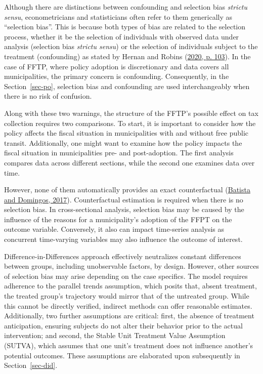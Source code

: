\documentclass[12pt, a4paper, twoside]{article}
\numberwithin{equation}{subsection} %
\begin{document}
Although there are distinctions between confounding and selection bias
\textit{strictu sensu}, econometricians and statisticians often refer to
them generically as ``selection bias''. This is because both types of
bias are related to the selection process, whether it be the selection
of individuals with observed data under analysis (selection bias
\textit{strictu sensu}) or the selection of individuals subject to the
treatment (confounding) as stated by Hernan and Robins
(\protect\hyperlink{ref-Hernan2020}{2020, p. 103}). In the case of FFTP,
where policy adoption is discretionary and data covers all
municipalities, the primary concern is confounding. Consequently, in the
Section~\ref{sec-po}, selection bias and confounding are used
interchangeably when there is no risk of confusion.

Along with these two warnings, the structure of the FFTP's possible
effect on tax collection requires two comparisons. To start, it is
important to consider how the policy affects the fiscal situation in
municipalities with and without free public transit. Additionally, one
might want to examine how the policy impacts the fiscal situation in
municipalities pre- and post-adoption. The first analysis compares data
across different sections, while the second one examines data over time.

However, none of them automatically provides an exact counterfactual
(\protect\hyperlink{ref-batista_domingos_2017}{Batista and Domingos,
2017}). Counterfactual estimation is required when there is no selection
bias. In cross-sectional analysis, selection bias may be caused by the
influence of the reasons for a municipality's adoption of the FFPT on
the outcome variable. Conversely, it also can impact time-series
analysis as concurrent time-varying variables may also influence the
outcome of interest.

Difference-in-Differences approach effectively neutralizes constant
differences between groups, including unobservable factors, by design.
However, other sources of selection bias may arise depending on the case
specifics. The model requires adherence to the parallel trends
assumption, which posits that, absent treatment, the treated group's
trajectory would mirror that of the untreated group. While this cannot
be directly verified, indirect methods can offer reasonable estimates.
Additionally, two further assumptions are critical: first, the absence
of treatment anticipation, ensuring subjects do not alter their behavior
prior to the actual intervention; and second, the Stable Unit Treatment
Value Assumption (SUTVA), which assumes that one unit's treatment does
not influence another's potential outcomes. These assumptions are
elaborated upon subsequently in Section~\ref{sec-did}.
\end{document}
